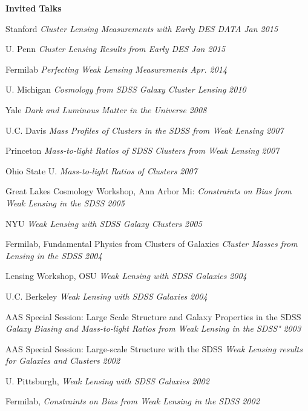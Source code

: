\ssp
\ssp
\noindent
\parbox[l]{1.25in}{{\bf Invited Talks}}
\parbox[t]{5.40in}{

Stanford {\it Cluster Lensing Measurements with Early DES DATA} \hfill {\small \it Jan 2015} \newline

U. Penn  {\it Cluster Lensing Results from Early DES} \hfill {\small \it Jan 2015} \newline

Fermilab {\it Perfecting Weak Lensing Measurements} \hfill {\small \it Apr. 2014} \newline

U. Michigan {\it  Cosmology from SDSS Galaxy Cluster Lensing} \hfill {\small \it 2010} \newline

Yale   {\it Dark and Luminous Matter in the Universe}     \hfill {\small \it 2008} \newline

U.C. Davis  {\it Mass Profiles of Clusters in the SDSS from Weak Lensing} \hfill {\small \it 2007} \newline

Princeton  {\it Mass-to-light Ratios of SDSS Clusters from Weak Lensing} \hfill {\small \it 2007} \newline

Ohio State U. {\it Mass-to-light Ratios of Clusters} \hfill {\small \it 2007} \newline

Great Lakes Cosmology Workshop, Ann Arbor Mi: {\it Constraints on Bias from Weak Lensing in the SDSS} \hfill {\small \it 2005}

NYU {\it Weak Lensing with SDSS Galaxy Clusters} \hfill {\small \it 2005} \newline

Fermilab, Fundamental Physics from Clusters of Galaxies {\it Cluster Masses from Lensing in the SDSS} \hfill {\small \it 2004} \newline

Lensing Workshop, OSU {\it Weak Lensing with SDSS Galaxies} \hfill {\small \it 2004} \newline

U.C. Berkeley {\it Weak Lensing with SDSS Galaxies} \hfill {\small \it 2004} \newline

AAS Special Session: Large Scale Structure and Galaxy Properties in the SDSS {\it Galaxy Biasing and Mass-to-light Ratios from Weak Lensing in the SDSS"} \hfill {\small \it 2003} \newline

AAS Special Session: Large-scale Structure with the SDSS {\it Weak Lensing results for Galaxies and Clusters} \hfill {\small \it 2002} \newline

U. Pittsburgh, {\it Weak Lensing with SDSS Galaxies} \hfill {\small \it 2002} \newline

Fermilab, {\it Constraints on Bias from Weak Lensing in the SDSS} \hfill {\small \it 2002} \newline
}
